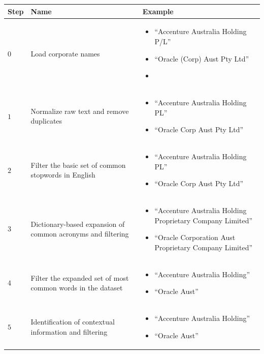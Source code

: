 \documentclass{llncs}
\begin{document}
\begin{table}[!htb]
\renewcommand{\arraystretch}{1.3}
\begin{center}
\begin{tabular}{|p{1cm}|p{5.5cm}|p{5.5cm}|}
\hline

  \textbf{Step} & \textbf{Name} & \textbf{Example}  \\  \hline
  $0$ & Load corporate names & \begin{itemize} \item  ``Accenture  Australia Holding P/L'' \item  ``Oracle (Corp) Aust Pty Ltd'' \item \end{itemize} \\ \hline
  $1$ & Normalize raw text and remove duplicates & \begin{itemize} \item  ``Accenture  Australia Holding PL'' \item  ``Oracle Corp Aust Pty Ltd'' \end{itemize} \\ \hline
  $2$ & Filter the basic set of common stopwords in English & \begin{itemize} \item  ``Accenture  Australia Holding PL'' \item  ``Oracle Corp Aust Pty Ltd'' \end{itemize} \\ \hline  
  $3$ & Dictionary-based expansion of common acronyms and filtering & \begin{itemize} \item  ``Accenture  Australia Holding Proprietary Company Limited'' \item  ``Oracle Corporation Aust Proprietary Company Limited'' \end{itemize} \\ \hline
  $4$ & Filter the expanded set of most common words in the dataset & \begin{itemize} \item  ``Accenture  Australia Holding'' \item  ``Oracle Aust'' \end{itemize} \\ \hline
  $5$ & Identification of contextual information and filtering & \begin{itemize} \item  ``Accenture  Australia Holding'' \item  ``Oracle Aust'' \end{itemize}\\ \hline

\end{tabular}
\end{center}
\end{table}
\end{document}
